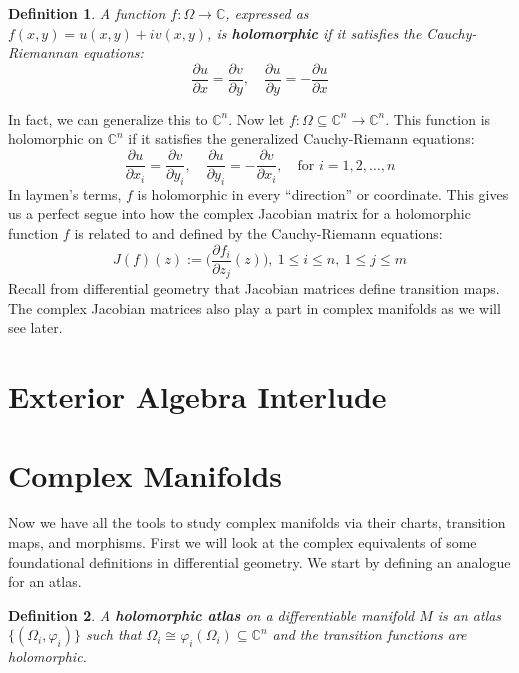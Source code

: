 \documentclass[12pt, letterpaper]{article}
\newtheorem{definition}{Definition}[section]
\newcommand{\C}{\mathbb{C}}
\newcommand{\ten}[1]{\textnormal{\textbf{#1}}}
\begin{document}
\begin{definition}\label{3.2}
    A function $f: \Omega \to \C$, expressed as $f(x,y) = u(x,y) + iv(x,y)$,
    is \ten{holomorphic} if it satisfies the Cauchy-Riemannan
    equations:
    \begin{equation*}
        \dfrac{\partial u}{\partial x} = \dfrac{\partial v}{\partial y}, \quad
        \dfrac{\partial u}{\partial y} = - \dfrac{\partial u}{\partial x}
    \end{equation*}
\end{definition}
In fact, we can generalize this to $\C^n$. Now let $f: \Omega \subseteq \C^n \to
\C^n$. This function is holomorphic on $\C^n$ if it satisfies the generalized 
Cauchy-Riemann equations:
\begin{equation*}
    \dfrac{\partial u}{\partial x_i} = \dfrac{\partial v}{\partial y_i}, \quad 
    \dfrac{\partial u}{\partial y_i} = - \dfrac{\partial v}{\partial x_i},\quad
    \text{for } i = 1, 2, \hdots , n
\end{equation*} 
In laymen's terms, $f$ is holomorphic in every ``direction'' or coordinate. This
gives us a perfect segue into how the complex Jacobian matrix for a holomorphic function
$f$ is related to and defined by the Cauchy-Riemann equations:
\begin{equation*}
    J(f)(z):= \bigg(\dfrac{\partial f_i}{\partial z_j}(z)\bigg), \ 1 \leq i \leq n, \
    1 \leq j \leq m
\end{equation*}
Recall from differential geometry that Jacobian matrices define transition maps.
The complex Jacobian matrices also play a part in complex manifolds as we will see
later.

\section{Exterior Algebra Interlude}

\section{Complex Manifolds}
Now we have all the tools to study complex manifolds via their charts, transition
maps, and morphisms. First we will look at the complex equivalents of some foundational
definitions in differential geometry. We start by defining an analogue for an atlas.

\begin{definition}
    A \ten{holomorphic atlas} on a differentiable manifold $M$ is an atlas
    $\{(\Omega_i, \varphi_i)\}$ such that $\Omega_i \cong \varphi_i(\Omega_i) \subseteq
    \C^n$ and the transition functions are holomorphic.
\end{definition}
\end{document}
